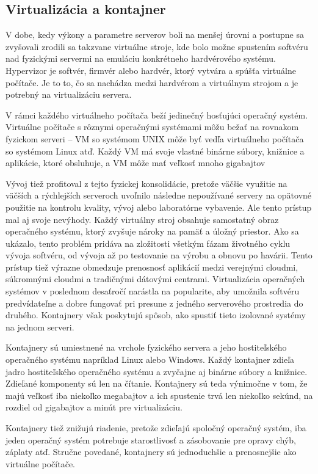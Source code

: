 \subsection{Virtualizácia a kontajner}

V dobe, kedy výkony a parametre serverov boli na menšej úrovni a postupne sa zvyšovali zrodili sa takzvane virtuálne stroje, kde bolo možne spustením softvéru nad fyzickými servermi na emuláciu konkrétneho hardvérového systému. Hypervizor je softvér, firmvér alebo hardvér, ktorý vytvára a spúšťa virtuálne počítače. Je to to, čo sa nachádza medzi hardvérom a virtuálnym strojom a je potrebný na virtualizáciu servera.

V rámci každého virtuálneho počítača beží jedinečný hosťujúci operačný systém. Virtuálne počítače s rôznymi operačnými systémami môžu bežať na rovnakom fyzickom serveri – VM so systémom UNIX môže byť vedľa virtuálneho počítača so systémom Linux atď. Každý VM má svoje vlastné binárne súbory, knižnice a aplikácie, ktoré obsluhuje, a VM môže mať veľkosť mnoho gigabajtov

Vývoj tiež profitoval z tejto fyzickej konsolidácie, pretože väčšie využitie na väčších a rýchlejších serveroch uvoľnilo následne nepoužívané servery na opätovné použitie na kontrolu kvality, vývoj alebo laboratórne vybavenie. Ale tento prístup mal aj svoje nevýhody. Každý virtuálny stroj obsahuje samostatný obraz operačného systému, ktorý zvyšuje nároky na pamäť a úložný priestor. Ako sa ukázalo, tento problém pridáva na zložitosti všetkým fázam životného cyklu vývoja softvéru, od vývoja až po testovanie na výrobu a obnovu po havárii. Tento prístup tiež výrazne obmedzuje prenosnosť aplikácií medzi verejnými cloudmi, súkromnými cloudmi a tradičnými dátovými centrami. Virtualizácia operačných systémov v poslednom desaťročí narástla na popularite, aby umožnila softvéru predvídateľne a dobre fungovať pri presune z jedného serverového prostredia do druhého. Kontajnery však poskytujú spôsob, ako spustiť tieto izolované systémy na jednom serveri.

Kontajnery sú umiestnené na vrchole fyzického servera a jeho hostiteľského operačného systému napríklad Linux alebo Windows. Každý kontajner zdieľa jadro hostiteľského operačného systému a zvyčajne aj binárne súbory a knižnice. Zdieľané komponenty sú len na čítanie. Kontajnery sú teda výnimočne v tom, že majú veľkosť iba niekoľko megabajtov a ich spustenie trvá len niekoľko sekúnd, na rozdiel od gigabajtov a minút pre virtualizáciu.

Kontajnery tiež znižujú riadenie, pretože zdieľajú spoločný operačný systém, iba jeden operačný systém potrebuje starostlivosť a zásobovanie pre opravy chýb, záplaty atď. Stručne povedané, kontajnery sú jednoduchšie a prenosnejšie ako virtuálne počítače.

